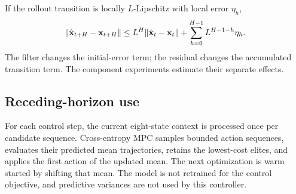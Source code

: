 If the rollout transition is locally $L$-Lipschitz with local error $\eta_h$,
\begin{equation}
 \|\hat{\mathbf{x}}_{t+H}-\mathbf{x}_{t+H}\|
 \le L^H\|\hat{\mathbf{x}}_t-\mathbf{x}_t\|
 +\sum_{h=0}^{H-1}L^{H-1-h}\eta_h.
 \label{eq:rollout_bound}
\end{equation}
The filter changes the initial-error term; the residual changes the accumulated
transition term. The component experiments estimate their separate effects.

\subsection{Receding-horizon use}

For each control step, the current eight-state context is processed once per
candidate sequence. Cross-entropy MPC samples bounded action sequences,
evaluates their predicted mean trajectories, retains the lowest-cost elites,
and applies the first action of the updated mean. The next optimization is warm
started by shifting that mean. The model is not retrained for the control
objective, and predictive variances are not used by this controller.

